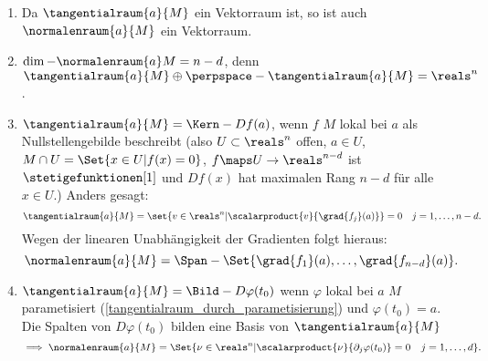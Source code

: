 \begin{bemerkungen}
  \begin{enumerate}
    \item Da \( \tangentialraum{a}{M} \) ein Vektorraum ist, so ist auch \( \normalenraum{a}{M} \) ein Vektorraum.
    \item \( \dim-{\normalenraum{a}}{M}=n-d \), denn \( \tangentialraum{a}{M}\oplus \perpspace-{\tangentialraum{a}{M}}=\reals^n \).
    \item \( \tangentialraum{a}{M}=\Kern-{Df(a)} \), wenn \( f \) \( M \) lokal bei \( a \) als Nullstellengebilde beschreibt (also \texists  \( U\subset \reals^n \) offen, \( a\in U \), \sd \( M\cap U=\Set{x\in U|f(x)=0} \), \( f\maps U\to \reals^{n-d} \) ist \( \stetigefunktionen[1] \) und \( Df(x) \) hat maximalen Rang \( n-d \) für alle \( x\in U \).) Anders gesagt: 
    \begin{equation*}
      \tangentialraum{a}{M}=\set{v\in \reals^n|\scalarproduct{v}{\grad{f_j}(a)}}=0\quad j=1,\dotsc,n-d.
    \end{equation*}
    Wegen der linearen Unabhängigkeit der Gradienten folgt hieraus:
    \begin{equation*}
      \normalenraum{a}{M}=\Span-{\Set{\grad{f_1}(a),\dotsc,\grad{f_{n-d}}(a)}}.
    \end{equation*}
    \item \( \tangentialraum{a}{M}=\Bild-{D\varphi(t_0)} \) wenn \( \varphi \) lokal bei \( a \) \( M \) parametisiert (\vgl \ref{tangentialraum_durch_parametisierung}) und \( \varphi(t_0)=a \). Die Spalten von \( D\varphi(t_0) \) bilden eine Basis von \( \tangentialraum{a}{M} \)
    \begin{equation*}
      \implies \normalenraum{a}{M}=\Set{\nu\in \reals^n|\scalarproduct{\nu}{\partial_j \varphi(t_0)}=0\quad j=1,\dotsc,d}.
    \end{equation*}
  \end{enumerate}
\end{bemerkungen}
